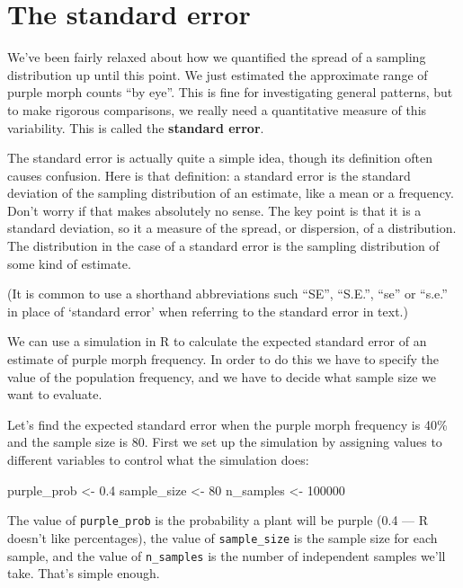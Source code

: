\documentclass[]{book}
\newenvironment{Shaded}{\begin{snugshade}}{\end{snugshade}}
\newcommand{\DecValTok}[1]{\textcolor[rgb]{0.00,0.00,0.81}{{#1}}}
\newcommand{\FloatTok}[1]{\textcolor[rgb]{0.00,0.00,0.81}{{#1}}}
\newcommand{\StringTok}[1]{\textcolor[rgb]{0.31,0.60,0.02}{{#1}}}
\newcommand{\NormalTok}[1]{{#1}}
\begin{document}
\section{The standard error}\label{the-standard-error}

We've been fairly relaxed about how we quantified the spread of a
sampling distribution up until this point. We just estimated the
approximate range of purple morph counts ``by eye''. This is fine for
investigating general patterns, but to make rigorous comparisons, we
really need a quantitative measure of this variability. This is called
the \textbf{standard error}.

The standard error is actually quite a simple idea, though its
definition often causes confusion. Here is that definition: a standard
error is the standard deviation of the sampling distribution of an
estimate, like a mean or a frequency. Don't worry if that makes
absolutely no sense. The key point is that it is a standard deviation,
so it a measure of the spread, or dispersion, of a distribution. The
distribution in the case of a standard error is the sampling
distribution of some kind of estimate.

(It is common to use a shorthand abbreviations such ``SE'', ``S.E.'',
``se'' or ``s.e.'' in place of `standard error' when referring to the
standard error in text.)

We can use a simulation in R to calculate the expected standard error of
an estimate of purple morph frequency. In order to do this we have to
specify the value of the population frequency, and we have to decide
what sample size we want to evaluate.

Let's find the expected standard error when the purple morph frequency
is 40\% and the sample size is 80. First we set up the simulation by
assigning values to different variables to control what the simulation
does:

\begin{Shaded}
\begin{Highlighting}[]
\NormalTok{purple_prob <-}\StringTok{ }\FloatTok{0.4}
\NormalTok{sample_size <-}\StringTok{ }\DecValTok{80}
\NormalTok{n_samples <-}\StringTok{ }\DecValTok{100000}
\end{Highlighting}
\end{Shaded}

The value of \texttt{purple\_prob} is the probability a plant will be
purple (0.4 --- R doesn't like percentages), the value of
\texttt{sample\_size} is the sample size for each sample, and the value
of \texttt{n\_samples} is the number of independent samples we'll take.
That's simple enough.
\end{document}
